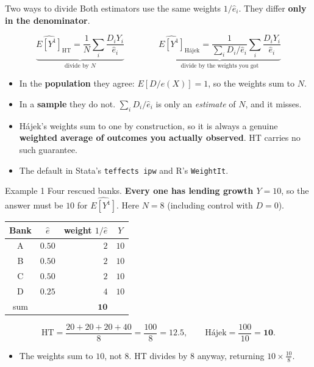 \documentclass[
  11pt,
  ignorenonframetext,
  aspectratio=169,
]{beamer}
\providecommand{\tightlist}{%
  \setlength{\itemsep}{0pt}\setlength{\parskip}{0pt}}
\begin{document}
\begin{frame}[fragile]{Two ways to divide}
\protect{}\label{two-ways-to-divide}
Both estimators use the same weights \(1/\hat e_i\). They differ
\textbf{only in the denominator}.

\vspace{-0.2em}

\[
\underbrace{\widehat{E[Y^1]}_{\text{HT}} = \frac{1}{N}\sum_i \frac{D_i Y_i}{\hat e_i}}_{\text{divide by } N}
\qquad\qquad
\underbrace{\widehat{E[Y^1]}_{\text{Hájek}} = \frac{1}{\sum_i D_i/\hat e_i}\sum_i \frac{D_i Y_i}{\hat e_i}}_{\text{divide by the weights you got}}
\]

\begin{itemize}
\tightlist
\item
  In the \textbf{population} they agree: \(E[D/e(X)] = 1\), so the
  weights sum to \(N\).
\item
  In a \textbf{sample} they do not. \(\sum_i D_i/\hat e_i\) is only an
  \emph{estimate} of \(N\), and it misses.
\item
  Hájek's weights sum to one by construction, so it is always a genuine
  \textbf{weighted average of outcomes you actually observed}. HT
  carries no such guarantee.
\item
  The default in Stata's \texttt{teffects\ ipw} and R's
  \texttt{WeightIt}.
\end{itemize}
\end{frame}

\begin{frame}{Example 1}
\protect{}\label{example-1}
Four rescued banks. \textbf{Every one has lending growth \(Y = 10\)}, so
the answer must be \(10\) for \(\widehat{E[Y^1]}\). Here \(N = 8\)
(including control with \(D=0\)).

\begin{center}
\footnotesize
\begin{tabular}{ccrc}
\toprule
Bank & $\hat e$ & weight $1/\hat e$ & $Y$ \\
\midrule
A & $0.50$ & $2$ & $10$ \\
B & $0.50$ & $2$ & $10$ \\
C & $0.50$ & $2$ & $10$ \\
D & $0.25$ & $4$ & $10$ \\
\midrule
sum & & $\mathbf{10}$ & \\
\bottomrule
\end{tabular}
\end{center}

\vspace{-0.3em}
\small

\[
\text{HT} = \frac{20+20+20+40}{8} = \frac{100}{8} = \mathbf{12.5},
\qquad
\text{Hájek} = \frac{100}{10} = \mathbf{10} .
\] \normalsize

\begin{itemize}
\tightlist
\item
  The weights sum to \(10\), not \(8\). HT divides by \(8\) anyway,
  returning \(10 \times \tfrac{10}{8}\).
\end{itemize}
\end{frame}
\end{document}
